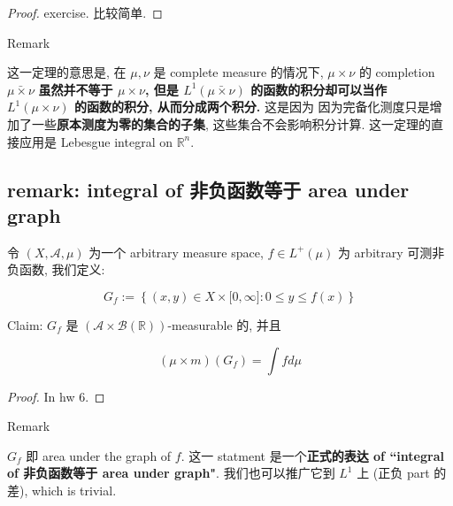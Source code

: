 \begin{proof}

exercise. 比较简单.

\end{proof}

\begin{qlremark}{Remark}

这一定理的意思是, 在 \(\mu,\nu\) 是 complete measure 的情况下, \(\mu \times \nu\) 的 completion \(\bar{\mu\times\nu}\) \textbf{虽然并不等于 \(\mu \times \nu\), 但是 \(L^{1}(\bar{\mu\times\nu})\) 的函数的积分却可以当作 \(L^{1}(\mu \times \nu)\) 的函数的积分, 从而分成两个积分.} 这是因为 因为完备化测度只是增加了一些\textbf{原本测度为零的集合的子集}, 这些集合不会影响积分计算. 这一定理的直接应用是 Lebesgue integral on \(\mathbb{R}^{n}\).

\end{qlremark}

\subsection{remark: integral of 非负函数等于 area under graph}\label{remark-integral-of-ux975eux8d1fux51fdux6570ux7b49ux4e8e-area-under-graph}

\begin{theorem}

令 \((X,\mathcal{A},\mu)\) 为一个 arbitrary measure space, \(f \in L^{+}(\mu)\) 为 arbitrary 可测非负函数, 我们定义:

\[G_{f} := \left\{ {(x,y) \in X \times \lbrack 0,\infty\rbrack:0 \leq y \leq f(x)} \right\}\]

Claim: \(G_{f}\) 是 \((\mathcal{A} \times \mathcal{B}(\mathbb{R}))\)-measurable 的, 并且

\[(\mu \times m)(G_{f}) = \int f d\mu\]

\end{theorem}

\begin{proof}

In hw 6.

\end{proof}

\begin{qlremark}{Remark}

\(G_{f}\) 即 area under the graph of \(f\). 这一 statment 是一个\textbf{正式的表达 of ``integral of 非负函数等于 area under graph"}. 我们也可以推广它到 \(L^{1}\) 上 (正负 part 的差), which is trivial.

\end{qlremark}
